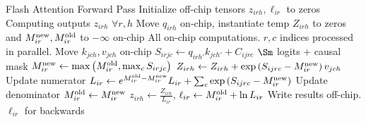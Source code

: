 \begin{algo}{Flash Attention Forward Pass}
\State Initialize off-chip tensors $ z _{ irh },  \ell _{ ir }$ to zeros \Comment Computing outputs $ z _{ irh } $ $ \forall r, h $
\State Move  $ q _{ irh }$ on-chip, instantiate temp $Z _{ irh }$ to zeros and $ M ^{ {\rm new} } _{ ir }, M ^{ {\rm old} } _{ ir } $ to $ -\infty $ on-chip
 \Comment All on-chip computations. $ r, c $ indices processed in parallel.
    \State Move  $ k_{ jch },v _{ jch }$ on-chip
    \State $ S _{ irjc } \gets   q _{ irh' } k _{ jch' } + C _{ ijrc } $ \Comment $ \Sm $ logits + causal mask
    \State $ M ^{ {\rm new} } _{ ir } \gets  \max \left ( M ^{ {\rm  old} } _{ ir }, \max_{ c }  S _{ irjc }  \right )   $
    \State $ Z _{ irh } \gets   Z _{ irh } +\exp \left (  S _{ ijrc } - M ^{ {\rm  new} } _{ ir }  \right ) v _{ jch }$ \Comment Update numerator
    \State $ L _{ ir } \gets   e ^{ M ^{ {\rm old} } _{ ir } - M ^{ {\rm  new} } _{ ir } } L _{ ir } +\sum _{ c }\exp \left (   S _{ ijrc } - M ^{ {\rm  new} } _{ ir }   \right ) $ \Comment Update denominator
    \State $ M ^{ {\rm old} } _{ ir } \gets  M ^{ {\rm  new} } _{ ir }   $
\EndFor
\State $ z _{ irh } \gets \frac{Z _{ irh }}{L _{ ir }}$, $  \ell _{ ir } \gets M ^{ {\rm old} } _{ ir } + \ln L _{ ir }$ \Comment Write results off-chip. $ \ell _{ ir } $ for backwards
\EndFor
\label{algo_fa_fwd_advanced}
\end{algo}

